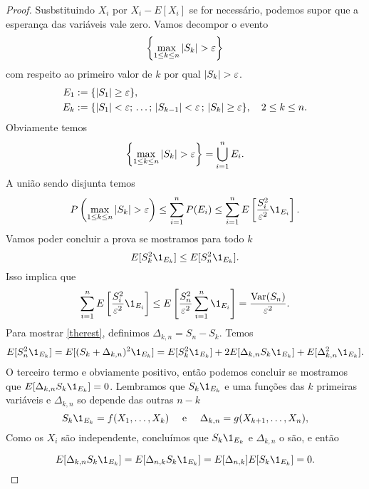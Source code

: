 \begin{topics}
\begin{proof}
 Susbstituindo $X_i$ por $X_i-E[X_i]$ se for necessário, podemos supor que a esperança das variáveis vale zero.
 Vamos decompor o evento
 $$\left\{ \max_{1\le k\le n} |S_k|>\gep \right\}$$ com respeito ao primeiro valor de $k$ por qual $|S_k|>\gep$.
 \begin{equation}
  \begin{split}
E_1&:=\{|S_1|\ge \varepsilon  \},\\
E_k&:=\{|S_1|<\varepsilon;\, \dots ;\,  |S_{k-1}|<\varepsilon\, ;  \, |S_k|\ge \varepsilon  \}, \quad 2\le k\le n.
   \end{split}
\end{equation}
Obviamente temos $$\left\{\max_{1\le k\le n} |S_k|>\gep\right\}=\bigcup_{i=1}^n E_i.$$
A união sendo disjunta temos
\begin{equation}
P\left(\max_{1\le k\le n} |S_k|>\gep \right) \le  \sum_{i=1}^n P(E_i)\le  \sum_{i=1}^n E\left[  \frac{S^2_i}{\gep^2}\1_{E_i}\right].
\end{equation}
Vamos poder concluir a prova se mostramos para todo $k$
\begin{equation}\label{therest}
 E[S^2_k\1_{E_k}]\le E[S^2_n\1_{E_k}].
\end{equation}
Isso implica que
\begin{equation}
  \sum_{i=1}^n E\left[  \frac{S^2_i}{\gep^2}\1_{E_i}\right]\le E\left [  \frac{S^2_n}{\gep^2}  \sum_{i=1}^n \1_{E_i}\right]= \frac{\Var(S_n)}{\gep^2}.
\end{equation}
Para mostrar \eqref{therest}, definimos $\Delta_{k,n}= S_n-S_k$.
Temos
\begin{equation}
  E[S^2_n\1_{E_k}]= E[(S_k+\Delta_{k,n})^2\1_{E_k}]= E[S_k^2\1_{E_k}]+2 E[ \Delta_{k,n} S_k \1_{E_k}]+  E[ \Delta^2_{k,n}\1_{E_k}].
\end{equation}
O terceiro termo e obviamente positivo, então podemos concluir se mostramos  que $E[ \Delta_{k,n} S_k \1_{E_k}]=0$.
Lembramos que $S_k\1_{E_k}$ e uma funções das $k$ primeiras variáveis e $\Delta_{k,n}$ so depende das outras $n-k$
\begin{equation}
 S_k \1_{E_k}=f(X_1,\dots,X_k) \quad \text{ e } \quad \Delta_{k,n}=g(X_{k+1},\dots,X_{n}),
\end{equation}
Como os $X_i$ são independente, concluímos que  $S_k \1_{E_k}$ e $\Delta_{k,n}$ o são, e então

\begin{equation}
 E[ \Delta_{k,n} S_k \1_{E_k}]=E[\Delta_{n,k}S_k \1_{E_k}]=E[\Delta_{n,k}]E[S_k \1_{E_k}]=0.
\end{equation}
\end{proof}


\end{topics}
